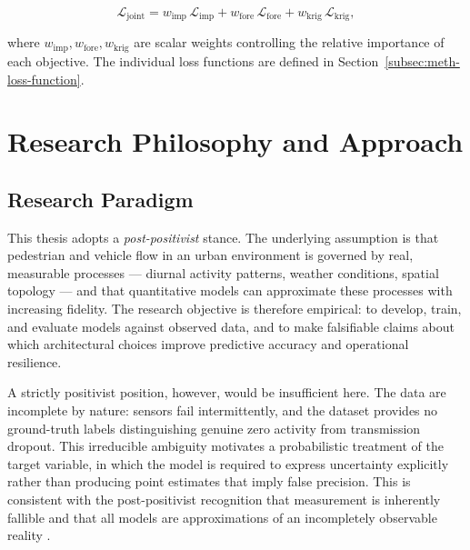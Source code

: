 \begin{equation}
    \mathcal{L}_{\text{joint}} = w_{\text{imp}} \,\mathcal{L}_{\text{imp}} + w_{\text{fore}} \,\mathcal{L}_{\text{fore}} + w_{\text{krig}} \,\mathcal{L}_{\text{krig}},
    \label{eq:joint-loss}
\end{equation}

\noindent where $w_{\text{imp}}, w_{\text{fore}}, w_{\text{krig}}$ are scalar weights controlling the relative importance of each objective. The individual loss functions are defined in Section~\ref{subsec:meth-loss-function}.

\section{Research Philosophy and Approach}
\label{sec:meth-philosophy}

\subsection{Research Paradigm}
\label{subsec:meth-paradigm}

This thesis adopts a \emph{post-positivist} stance. The underlying assumption is that pedestrian and vehicle flow in an urban environment is governed by real, measurable processes --- diurnal activity patterns, weather conditions, spatial topology --- and that quantitative models can approximate these processes with increasing fidelity. The research objective is therefore empirical: to develop, train, and evaluate models against observed data, and to make falsifiable claims about which architectural choices improve predictive accuracy and operational resilience.

A strictly positivist position, however, would be insufficient here. The data are incomplete by nature: sensors fail intermittently, and the dataset provides no ground-truth labels distinguishing genuine zero activity from transmission dropout. This irreducible ambiguity motivates a probabilistic treatment of the target variable, in which the model is required to express uncertainty explicitly rather than producing point estimates that imply false precision. This is consistent with the post-positivist recognition that measurement is inherently fallible and that all models are approximations of an incompletely observable reality \citep{shandCentralWorksPhilosophy2005}.

